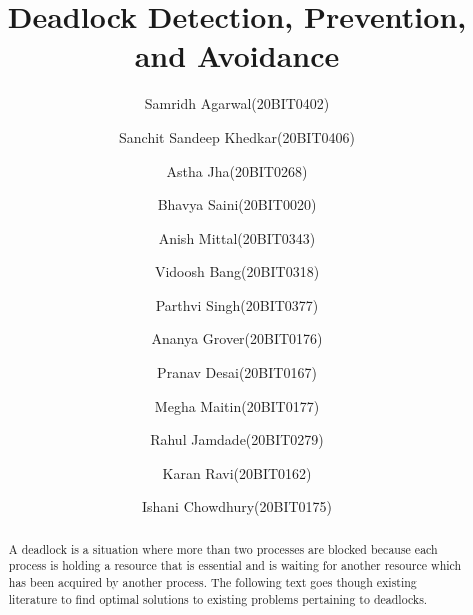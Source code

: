 \documentclass[sigplan,screen]{acmart}
\begin{document}
\title{Deadlock Detection, Prevention, and Avoidance}

\author{Samridh Agarwal(20BIT0402)}
\author{Sanchit Sandeep Khedkar(20BIT0406)}
\author{Astha Jha(20BIT0268)}
\author{Bhavya Saini(20BIT0020)}
\author{Anish Mittal(20BIT0343)}
\author{Vidoosh Bang(20BIT0318)}
\author{Parthvi Singh(20BIT0377)}
\author{Ananya Grover(20BIT0176)}
\author{Pranav Desai(20BIT0167)}
\author{Megha Maitin(20BIT0177)}
\author{Rahul Jamdade(20BIT0279)}
\author{Karan Ravi(20BIT0162)}
\author{Ishani Chowdhury(20BIT0175)}




\begin{abstract}
A deadlock is a situation where more than two processes are blocked because each process is holding a resource that is essential and is waiting for another resource which has been acquired by another process. The following text goes though existing literature to find optimal solutions to existing problems pertaining to deadlocks.
\end{abstract}

\end{document}
